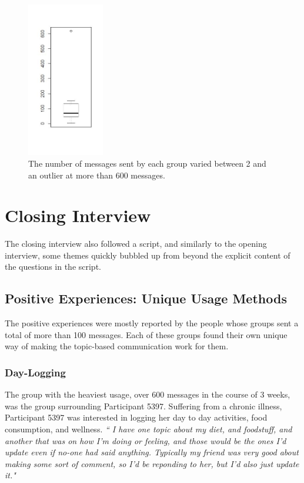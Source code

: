     \begin{figure}
      \centering
      \includegraphics[width=0.3\textwidth]{messages_per_group.jpeg}
      \caption[Messages Sent by Groups]{
        The number of messages sent by each group varied between
        2 and an outlier at more than 600 messages.
      }
      \label{fig:topic_hours}
      \end{figure}

\section{Closing Interview}
  The closing interview also followed a script,
  and similarly to the opening interview, some themes quickly bubbled up from
  beyond the explicit content of the questions in the script.

  \subsection{Positive Experiences: Unique Usage Methods}
    The positive experiences were mostly reported by the people
    whose groups sent a total of more than 100 messages.
    Each of these groups found their own unique way of making the topic-based
    communication work for them.

    \subsubsection{Day-Logging}
    The group with the heaviest usage, over 600 messages in the course of 3 weeks,
    was the group surrounding Participant 5397.
    Suffering from a chronic illness,
    Participant 5397 was interested in logging her day to day activities,
    food consumption, and wellness.
    \textit{
    `` I have one topic about my diet, and foodstuff, and another that was on
    how I'm doing or feeling, and those would be the ones I'd update
    even if no-one had said anything. Typically my friend was very good about making some sort of comment,
    so I'd be reponding to her, but I'd also just update it."
    }

